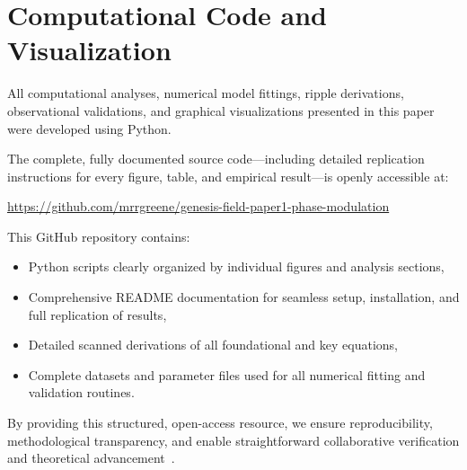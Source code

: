 \section{Computational Code and Visualization}
\label{sec:appendix_code}

All computational analyses, numerical model fittings, ripple derivations, observational validations, and graphical visualizations presented in this paper were developed using Python.

The complete, fully documented source code—including detailed replication instructions for every figure, table, and empirical result—is openly accessible at:

\begin{center}
\url{https://github.com/mrrgreene/genesis-field-paper1-phase-modulation}
\end{center}

This GitHub repository contains:

\begin{itemize}
    \item Python scripts clearly organized by individual figures and analysis sections,
    \item Comprehensive README documentation for seamless setup, installation, and full replication of results,
    \item Detailed scanned derivations of all foundational and key equations,
    \item Complete datasets and parameter files used for all numerical fitting and validation routines.
\end{itemize}

By providing this structured, open-access resource, we ensure reproducibility, methodological transparency, and enable straightforward collaborative verification and theoretical advancement~\cite{genesisfield2025code}.
